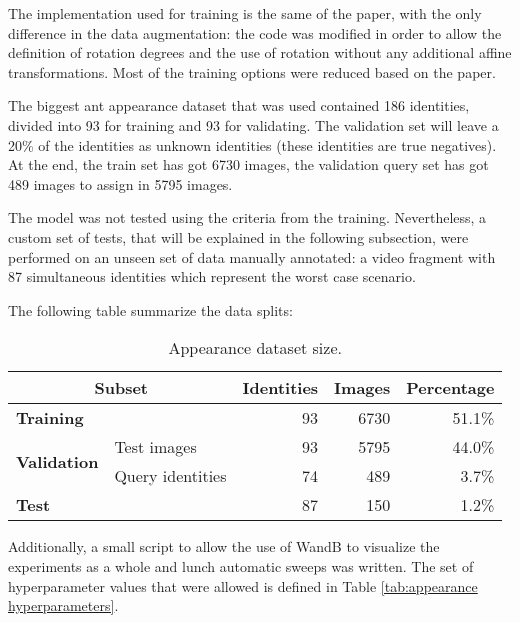 {
    The implementation used for training is the same of the paper, with the only difference in the data augmentation: the code was modified in order to allow the definition of rotation degrees and the use of rotation without any additional affine transformations. 
    Most of the training options were reduced based on the paper.
}

{
    The biggest ant appearance dataset that was used contained 186 identities, divided into 93 for training and 93 for validating. 
    The validation set will leave a 20\% of the identities as unknown identities (these identities are true negatives). 
    At the end, the train set has got 6730 images, the validation query set has got 489 images to assign in 5795 images. 
}

{
    The model was not tested using the criteria from the training. 
    Nevertheless, a custom set of tests, that will be explained in the following subsection, 
    were performed on an unseen set of data manually annotated: a video fragment with 87 simultaneous identities which represent the worst case scenario.
}

\enlargethispage{1.5\baselineskip}

\needspace{0.1\textheight}

{
    The following table summarize the data splits:
}

\begin{table}[H]
    \centering
    \caption[Appearance dataset size]{ \footnotesize Appearance dataset size.}
    \label{tab:appearance splits}

    \begin{tabular}{p{3cm}l rrr}
        \toprule
        \multicolumn{2}{c}{\textbf{Subset}} & \textbf{Identities} & \textbf{Images} & \textbf{Percentage} \\
        \midrule
        \midrule
        \multicolumn{2}{l}{\textbf{Training}} & 93 & 6730 & 51.1\% \\
        \multirow{2}{*}{\textbf{Validation}} & Test images & 93 & 5795 & 44.0\% \\
        & Query identities & 74 & 489 & 3.7\% \\
        \multicolumn{2}{l}{\textbf{Test}} & 87 & 150 & 1.2\% \\
        \bottomrule
    \end{tabular}
\end{table}

\vspace{1\baselineskip}

{
    Additionally, a small script to allow the use of \ac{WandB} to visualize the experiments as a whole and lunch automatic sweeps was written. 
    The set of hyperparameter values that were allowed is defined in Table \ref{tab:appearance hyperparameters}.
}


